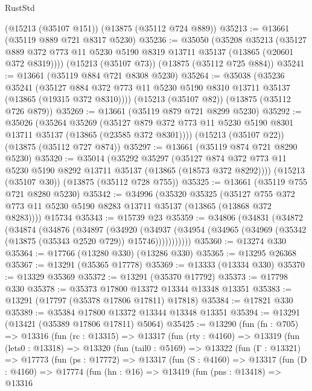 \begin{lexlean}{RustStd}
\begin{coremodule}
    (@15213 (@35107 @151))
    (@13875 (@35112 @724 @889))
@35213 := @13661 (@35119 @889 @721 @8317 @5230)
@35236 := @35050
    (@35208
      @35213
      (@35127 @889 @372 @773 @11 @5230 @5190 @8319 @13711 @35137 (@13865 (@20601 @372 @8319))))
    (@15213 (@35107 @73))
    (@13875 (@35112 @725 @884))
@35241 := @13661 (@35119 @884 @721 @8308 @5230)
@35264 := @35038
    (@35236
      @35241
      (@35127 @884 @372 @773 @11 @5230 @5190 @8310 @13711 @35137 (@13865 (@19315 @372 @8310))))
    (@15213 (@35107 @82))
    (@13875 (@35112 @726 @879))
@35269 := @13661 (@35119 @879 @721 @8299 @5230)
@35292 := @35026
    (@35264
      @35269
      (@35127 @879 @372 @773 @11 @5230 @5190 @8301 @13711 @35137 (@13865 (@23585 @372 @8301))))
    (@15213 (@35107 @22))
    (@13875 (@35112 @727 @874))
@35297 := @13661 (@35119 @874 @721 @8290 @5230)
@35320 := @35014
    (@35292
      @35297
      (@35127 @874 @372 @773 @11 @5230 @5190 @8292 @13711 @35137 (@13865 (@18573 @372 @8292))))
    (@15213 (@35107 @30))
    (@13875 (@35112 @728 @755))
@35325 := @13661 (@35119 @755 @721 @8280 @5230)
@35342 := @34996
    (@35320
      @35325
      (@35127 @755 @372 @773 @11 @5230 @5190 @8283 @13711 @35137 (@13865 (@13868 @372 @8283))))
    @15734
@35343 := @15739 @23
@35359 := @34806
    (@34831
      (@34872
        (@34874
          (@34876
            (@34897
              (@34920
                (@34937
                  (@34954 (@34965 (@34969 (@35342 (@13875 (@35343 @2520 @729)) @15746)))))))))))
@35360 := @13274 @330
@35364 := @17766 (@13280 @330) (@13286 @330)
@35365 := @13295 @26368
@35367 := @13291 (@35365 @17778)
@35369 := @13333 (@13334 @330)
@35370 := @13329 @35369
@35372 := @13291 (@35370 @17792)
@35373 := @17798 @330
@35378 := @35373 @17800 @13372 @13344 @13348 @13351
@35383 := @13291 (@17797 (@35378 @17806 @17811) @17818)
@35384 := @17821 @330
@35389 := @35384 @17800 @13372 @13344 @13348 @13351
@35394 := @13291 (@13421 (@35389 @17806 @17811) @5064)
@35425 := @13290
    (fun (fn : @705) =>
    @13316
      (fun (rc : @13315) =>
      @13317
        (fun (rty : @4160) =>
        @13319
          (fun (lets0 : @13318) =>
          @13320
            (fun (tail0 : @5169) =>
            @13322
              (fun (Γ : @13321) =>
              @17773
                (fun (ps : @17772) =>
                @13317
                  (fun (S : @4160) =>
                  @13317
                    (fun (D : @4160) =>
                    @17774
                      (fun (hn : @16) =>
                      @13419
                        (fun (pns : @13418) =>
                        @13316

\end{coremodule}
\end{lexlean}
